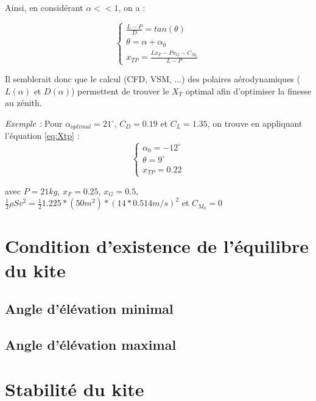 \documentclass[conference]{IEEEtran}
\begin{document}
Ainsi, en considérant $\alpha << 1$, on a :

\begin{equation}
    \begin{cases}
    \frac{L-P}{D} = tan(\theta) \\
    \theta = \alpha + \alpha_0 \\
    x_{TP} = \frac{L x_F - P x_G -C_{M_0}}{L - P}
    \end{cases}
    \label{eq:Xtp}
\end{equation}
    
Il semblerait donc que le calcul (CFD, VSM, ...) des polaires aérodynamiques ($L(\alpha)$ et $D(\alpha)$) permettent de trouver le $X_T$ optimal afin d'optimiser la finesse au zénith. 

\textit{Exemple : }
Pour $\alpha_{optimal} = 21^\circ$, $C_D = 0.19$ et $C_L = 1.35$, on trouve en appliquant l'équation \ref{eq:Xtp} : \\

\begin{equation}
    \begin{cases}
    \alpha_0 =  -12^\circ\\
    \theta = 9^\circ\\
    x_{TP} = 0.22
    \end{cases}
    \label{eq:Xtp}
\end{equation}

avec $P = 21 kg$, $x_F = 0.25$, $x_G = 0.5$,$\frac{1}{2} \rho S v^2 = \frac{1}{2} 1.225 * (50m^2) * (14 * 0.514 m/s)^2$  et $C_{M_0} = 0$

\IEEEpeerreviewmaketitle
\section{Condition d'existence de l'équilibre du kite }

\subsection{Angle d'élévation minimal} 


\subsection{Angle d'élévation maximal}

\section{Stabilité du kite }
\end{document}
